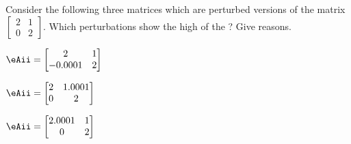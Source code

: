 \begin{exercise} \label{ex:} 
Consider the following three matrices which are perturbed versions of the matrix
\(\begin{bmatrix} 2&1\\0&2 \end{bmatrix}\).
Which perturbations show the high  of the ?  
Give reasons.
\begin{parts}
\item \(\eAii=\begin{bmatrix} 2&1\\-0.0001&2 \end{bmatrix}\)

\item \(\eAii=\begin{bmatrix} 2&1.0001\\0&2 \end{bmatrix}\)

\item \(\eAii=\begin{bmatrix} 2.0001&1\\0&2 \end{bmatrix}\)

\end{parts}
\end{exercise}





